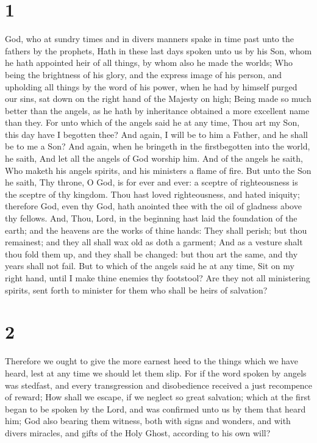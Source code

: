 \hypertarget{section}{%
\section{1}\label{section}}

 God, who at sundry times and in divers manners spake in
time past unto the fathers by the prophets,  Hath in these
last days spoken unto us by his Son, whom he hath appointed heir of all
things, by whom also he made the worlds;  Who being the
brightness of his glory, and the express image of his person, and
upholding all things by the word of his power, when he had by himself
purged our sins, sat down on the right hand of the Majesty on high;
 Being made so much better than the angels, as he hath by
inheritance obtained a more excellent name than they.  For
unto which of the angels said he at any time, Thou art my Son, this day
have I begotten thee? And again, I will be to him a Father, and he shall
be to me a Son?  And again, when he bringeth in the
firstbegotten into the world, he saith, And let all the angels of God
worship him.  And of the angels he saith, Who maketh his
angels spirits, and his ministers a flame of fire.  But
unto the Son he saith, Thy throne, O God, is for ever and ever: a
sceptre of righteousness is the sceptre of thy kingdom. 
Thou hast loved righteousness, and hated iniquity; therefore God, even
thy God, hath anointed thee with the oil of gladness above thy fellows.
 And, Thou, Lord, in the beginning hast laid the
foundation of the earth; and the heavens are the works of thine hands:
 They shall perish; but thou remainest; and they all
shall wax old as doth a garment;  And as a vesture shalt
thou fold them up, and they shall be changed: but thou art the same, and
thy years shall not fail.  But to which of the angels
said he at any time, Sit on my right hand, until I make thine enemies
thy footstool?  Are they not all ministering spirits,
sent forth to minister for them who shall be heirs of salvation?

\hypertarget{section-1}{%
\section{2}\label{section-1}}

 Therefore we ought to give the more earnest heed to the
things which we have heard, lest at any time we should let them slip.
 For if the word spoken by angels was stedfast, and every
transgression and disobedience received a just recompence of reward;
 How shall we escape, if we neglect so great salvation;
which at the first began to be spoken by the Lord, and was confirmed
unto us by them that heard him;  God also bearing them
witness, both with signs and wonders, and with divers miracles, and
gifts of the Holy Ghost, according to his own will?

